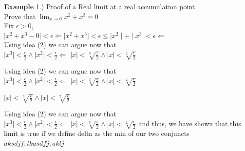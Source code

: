 \documentclass[12pt]{article}
\theoremstyle{definition}
\newenvironment{example}{\vspace{1em}\noindent\textbf{Example}}{\vspace{1em}}
\begin{document}
\begin{example}
1.) Proof of a Real limit at a real accumulation point.\\
Prove that $ \lim_{x\to 0} x^2 + x^3 = 0$\\

Fix $\epsilon > 0$,\\
$\mid x^2 + x^3 - 0 \mid < \epsilon \Leftarrow \mid x^2 + x^3 \mid < \epsilon \le \mid x^2 \mid + \mid x^3 \mid < \epsilon \Leftarrow $\\
Using idea (2) we can argue now that\\
$\mid x^3 \mid < \frac{\epsilon}{2} \land \mid x^2 \mid < \frac{\epsilon}{2} \Leftarrow$
$ \mid x \mid < \sqrt[3]{\frac{\epsilon}{2}} \land  \mid x \mid < \sqrt[2]{\frac{\epsilon}{2}} $


Using idea (2) we can argue now that\\
$\mid x^3 \mid < \frac{\epsilon}{2} \land \mid x^2 \mid < \frac{\epsilon}{2} \Leftarrow$
$ \mid x \mid < \sqrt[3]{\frac{\epsilon}{2}} \land  \mid x \mid < \sqrt[2]{\frac{\epsilon}{2}} $



$ \mid x \mid < \sqrt[3]{\frac{\epsilon}{2}} \land  \mid x \mid < \sqrt[2]{\frac{\epsilon}{2}} $


Using idea (2) we can argue now that\\
$\mid x^3 \mid < \frac{\epsilon}{2} \land \mid x^2 \mid < \frac{\epsilon}{2} \Leftarrow$
$ \mid x \mid < \sqrt[3]{\frac{\epsilon}{2}} \land  \mid x \mid < \sqrt[2]{\frac{\epsilon}{2}} $
and thus, we have shown that this limit is true if we define delta as the min of our two conjuncts\\
$  aksdjf;lkasdfj ;aklj$



\end{example}





 
\end{document}
